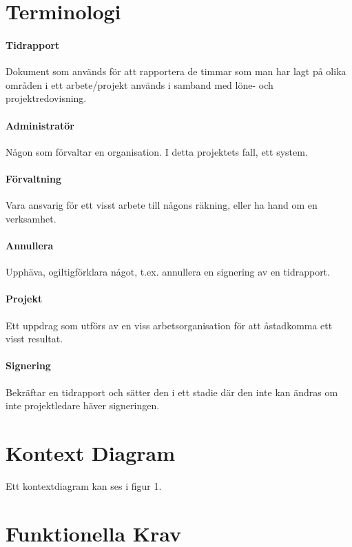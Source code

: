 \documentclass[paper=a4, fontsize=11pt,twoside]{article}
\begin{document}
	\section{Terminologi}
	\paragraph{Tidrapport}
	\flushleft
	Dokument som används för att rapportera de timmar som man har lagt på olika områden i ett arbete/projekt används i samband med löne- och projektredovisning.
	\paragraph{Administratör}
	\flushleft
	Någon som förvaltar en organisation. I detta projektets fall, ett system.
	\paragraph{Förvaltning}
	\flushleft
	Vara ansvarig för ett visst arbete till någons räkning, eller ha hand om en verksamhet.
	\paragraph{Annullera}
	\flushleft
	Upphäva, ogiltigförklara något, t.ex. annullera en signering av en tidrapport.
	\paragraph{Projekt}
	\flushleft
	Ett uppdrag som utförs av en viss arbetsorganisation för att åstadkomma ett visst resultat. 
	\paragraph{Signering}
	\flushleft
	Bekräftar en tidrapport och sätter den i ett stadie där den inte kan ändras om inte projektledare häver signeringen.
	\paragraph{}
	\newpage
	\section{Kontext Diagram}
	Ett kontextdiagram kan ses i figur 1.
	
	\section{Funktionella Krav}
	
\end{document}
